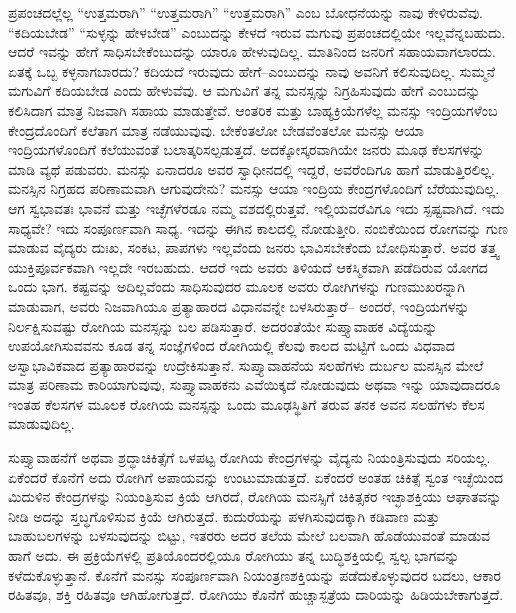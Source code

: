 ಪ್ರಪಂಚದಲ್ಲೆಲ್ಲ “ಉತ್ತಮರಾಗಿ” “ಉತ್ತಮರಾಗಿ” “ಉತ್ತಮರಾಗಿ” ಎಂಬ ಬೋಧನೆಯನ್ನು ನಾವು ಕೇಳಿರುವೆವು. “ಕದಿಯಬೇಡ” “ಸುಳ್ಳನ್ನು ಹೇಳಬೇಡ” ಎಂಬುದನ್ನು ಕೇಳದೆ ಇರುವ ಮಗುವು ಪ್ರಪಂಚದಲ್ಲಿಯೇ ಇಲ್ಲವೆನ್ನಬಹುದು. ಆದರೆ ಇವನ್ನು ಹೇಗೆ ಸಾಧಿಸಬೇಕೆಂಬುದನ್ನು ಯಾರೂ ಹೇಳುವುದಿಲ್ಲ. ಮಾತಿನಿಂದ ಜನರಿಗೆ ಸಹಾಯವಾಗಲಾರದು. ಏತಕ್ಕೆ ಒಬ್ಬ ಕಳ್ಳನಾಗಬಾರದು? ಕದಿಯದೆ ಇರುವುದು ಹೇಗೆ–ಎಂಬುದನ್ನು ನಾವು ಅವನಿಗೆ ಕಲಿಸುವುದಿಲ್ಲ. ಸುಮ್ಮನೆ ಮಗುವಿಗೆ ಕದಿಯಬೇಡ ಎಂದು ಹೇಳುವೆವು. ಆ ಮಗುವಿಗೆ ತನ್ನ ಮನಸ್ಸನ್ನು ನಿಗ್ರಹಿಸುವುದು ಹೇಗೆ ಎಂಬುದನ್ನು ಕಲಿಸಿದಾಗ ಮಾತ್ರ ನಿಜವಾಗಿ ಸಹಾಯ ಮಾಡುತ್ತೇವೆ. ಆಂತರಿಕ ಮತ್ತು ಬಾಹ್ಯಕ್ರಿಯೆಗಳೆಲ್ಲ ಮನಸ್ಸು ಇಂದ್ರಿಯಗಳೆಂಬ ಕೇಂದ್ರದೊಂದಿಗೆ ಕಲೆತಾಗ ಮಾತ್ರ ನಡೆಯುವುವು. ಬೇಕೆಂತಲೋ ಬೇಡವೆಂತಲೋ ಮನಸ್ಸು ಆಯಾ ಇಂದ್ರಿಯಗಳೊಂದಿಗೆ ಕಲೆಯುವಂತೆ ಬಲಾತ್ಕರಿಸಲ್ಪಡುತ್ತದೆ. ಅದಕ್ಕೋಸ್ಕರವಾಗಿಯೇ ಜನರು ಮೂಢ ಕೆಲಸಗಳನ್ನು ಮಾಡಿ ವ್ಯಥೆ ಪಡುವರು. ಮನಸ್ಸು ಏನಾದರೂ ಅವರ ಸ್ವಾಧೀನದಲ್ಲಿ ಇದ್ದರೆ, ಅವರೆಂದಿಗೂ ಹಾಗೆ ಮಾಡುತ್ತಿರಲಿಲ್ಲ. ಮನಸ್ಸಿನ ನಿಗ್ರಹದ ಪರಿಣಾಮವಾಗಿ ಆಗುವುದೇನು? ಮನಸ್ಸು ಆಯಾ ಇಂದ್ರಿಯ ಕೇಂದ್ರ\break ಗಳೊಂದಿಗೆ ಬೆರೆಯುವುದಿಲ್ಲ. ಆಗ ಸ್ವಭಾವತಃ ಭಾವನೆ ಮತ್ತು ಇಚ್ಛೆಗಳೆರಡೂ ನಮ್ಮ ವಶದಲ್ಲಿರುತ್ತವೆ. ಇಲ್ಲಿಯವರೆವಿಗೂ ಇದು ಸ್ಪಷ್ಟವಾಗಿದೆ. ಇದು ಸಾಧ್ಯವೇ? ಇದು ಸಂಪೂರ್ಣವಾಗಿ ಸಾಧ್ಯ. ಇದನ್ನು ಈಗಿನ ಕಾಲದಲ್ಲಿ ನೋಡುತ್ತೀರಿ. ನಂಬಿಕೆಯಿಂದ ರೋಗವನ್ನು ಗುಣ ಮಾಡುವ ವೈದ್ಯರು ದುಃಖ, ಸಂಕಟ, ಪಾಪಗಳು ಇಲ್ಲವೆಂದು ಜನರು ಭಾವಿಸಬೇಕೆಂದು ಬೋಧಿಸುತ್ತಾರೆ. ಅವರ ತತ್ತ್ವ ಯುಕ್ತಿಪೂರ್ವಕವಾಗಿ ಇಲ್ಲದೇ ಇರಬಹುದು. ಆದರೆ ಇದು ಅವರು ತಿಳಿಯದೆ ಆಕಸ್ಮಿಕವಾಗಿ ಪಡೆದಿರುವ ಯೋಗದ ಒಂದು ಭಾಗ. ಕಷ್ಟವನ್ನು ಅದಿಲ್ಲವೆಂದು ಸಾಧಿಸುವುದರ ಮೂಲಕ ಅವರು ರೋಗಿಗಳನ್ನು ಗುಣಮುಖರನ್ನಾಗಿ ಮಾಡುವಾಗ, ಅವರು ನಿಜವಾಗಿಯೂ ಪ್ರತ್ಯಾಹಾರದ ವಿಧಾನವನ್ನೇ ಬಳಸಿರುತ್ತಾರೆ– ಅಂದರೆ, ಇಂದ್ರಿಯಗಳನ್ನು ನಿರ್ಲಕ್ಷಿಸುವಷ್ಟು ರೋಗಿಯ ಮನಸ್ಸನ್ನು ಬಲ ಪಡಿಸುತ್ತಾರೆ. ಅದರಂತೆಯೇ ಸುಪ್ತ್ಯಾವಾಹಕ  ವಿದ್ಯೆಯನ್ನು ಉಪಯೋಗಿಸುವವನು ಕೂಡ ತನ್ನ ಸಂಜ್ಞೆಗಳಿಂದ ರೋಗಿಯಲ್ಲಿ ಕೆಲವು ಕಾಲದ ಮಟ್ಟಿಗೆ ಒಂದು ವಿಧವಾದ ಅಸ್ವಾಭಾವಿಕವಾದ ಪ್ರತ್ಯಾಹಾರವನ್ನು ಉದ್ರೇಕಿಸುತ್ತಾನೆ. ಸುಪ್ತ್ಯಾವಾಹನೆಯ ಸಲಹೆಗಳು ದುರ್ಬಲ ಮನಸ್ಸಿನ ಮೇಲೆ ಮಾತ್ರ ಪರಿಣಾಮ ಕಾರಿಯಾಗುವುವು, ಸುಪ್ತ್ಯಾವಾಹಕನು ಎವೆಯಿಕ್ಕದೆ ನೋಡುವುದು ಅಥವಾ ಇನ್ನು ಯಾವುದಾದರೂ ಇಂತಹ ಕೆಲಸಗಳ ಮೂಲಕ ರೋಗಿಯ ಮನಸ್ಸನ್ನು ಒಂದು ಮೂಢಸ್ಥಿತಿಗೆ ತರುವ ತನಕ ಅವನ ಸಲಹೆಗಳು ಕೆಲಸ ಮಾಡುವುದಿಲ್ಲ. 

\vskip 6pt

ಸುಪ್ತ್ಯಾವಾಹನೆಗೆ ಅಥವಾ ಶ್ರದ್ಧಾಚಿಕಿತ್ಸೆಗೆ ಒಳಪಟ್ಟ ರೋಗಿಯ ಕೇಂದ್ರಗಳನ್ನು ವೈದ್ಯನು ನಿಯಂತ್ರಿಸುವುದು ಸರಿಯಲ್ಲ. ಏಕೆಂದರೆ ಕೊನೆಗೆ ಅದು ರೋಗಿಗೆ ಅಪಾಯವನ್ನು ಉಂಟುಮಾಡುತ್ತದೆ. ಏಕೆಂದರೆ ಅಂತಹ ಚಿಕಿತ್ಸೆ ಸ್ವಂತ ಇಚ್ಛೆಯಿಂದ ಮಿದುಳಿನ ಕೇಂದ್ರಗಳನ್ನು ನಿಯಂತ್ರಿಸುವ ಕ್ರಿಯೆ ಆಗಿರದೆ, ರೋಗಿಯ ಮನಸ್ಸಿಗೆ ಚಿಕಿತ್ಸಕರ ಇಚ್ಛಾಶಕ್ತಿಯು ಆಘಾತವನ್ನು ನೀಡಿ ಅದನ್ನು ಸ್ತಬ್ಧಗೊಳಿಸುವ ಕ್ರಿಯೆ ಆಗಿರುತ್ತದೆ. ಕುದುರೆಯನ್ನು ಪಳಗಿಸುವುದಕ್ಕಾಗಿ ಕಡಿವಾಣ ಮತ್ತು ಬಾಹುಬಲಗಳನ್ನು ಬಳಸುವುದನ್ನು ಬಿಟ್ಟು, ಇತರರು ಅದರ ತಲೆಯ ಮೇಲೆ ಬಲವಾಗಿ ಹೊಡೆಯುವಂತೆ ಮಾಡುವ ಹಾಗೆ ಅದು. ಈ ಪ್ರಕ್ರಿಯೆಗಳಲ್ಲಿ ಪ್ರತಿಯೊಂದರಲ್ಲಿಯೂ ರೋಗಿಯು ತನ್ನ ಬುದ್ಧಿಶಕ್ತಿಯಲ್ಲಿ ಸ್ವಲ್ಪ ಭಾಗವನ್ನು ಕಳೆದುಕೊಳ್ಳುತ್ತಾನೆ. ಕೊನೆಗೆ ಮನಸ್ಸು ಸಂಪೂರ್ಣವಾಗಿ ನಿಯಂತ್ರಣಶಕ್ತಿಯನ್ನು ಪಡೆದುಕೊಳ್ಳುವುದರ ಬದಲು, ಆಕಾರ ರಹಿತವೂ, ಶಕ್ತಿ ರಹಿತವೂ ಆಗಿಹೋಗುತ್ತದೆ. ರೋಗಿಯು ಕೊನೆಗೆ ಹುಚ್ಚಾಸ್ಪತ್ರೆಯ ದಾರಿಯನ್ನು ಹಿಡಿಯಬೇಕಾಗುತ್ತದೆ. 

